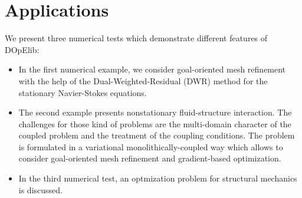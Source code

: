 \documentclass[prodmode,acmtoms]{acmsmall}
\numberwithin{equation}{section}
\newcommand{\todo}[1]{\textbf{\textsc{\textcolor{black}{TODO: #1}}}}
\begin{document}
%
%
%
%
%
%
%
\section{Applications}
\label{applications}
We present three numerical tests which demonstrate different
features of DOpElib:
\begin{itemize}
\item In the first numerical example, we consider 
goal-oriented mesh refinement with the help of the 
Dual-Weighted-Residual (DWR) method for the stationary Navier-Stokes equations.
\item The second example presents nonstationary fluid-structure 
interaction. The challenges for those kind of problems are the multi-domain
character of the coupled problem and the treatment of the coupling conditions.
The problem is formulated in a variational monolithically-coupled way which 
allows to consider goal-oriented mesh refinement and gradient-based optimization.
\item In the third numerical test, an optmization problem for structural mechanics
is discussed.
\end{itemize}
\end{document}
